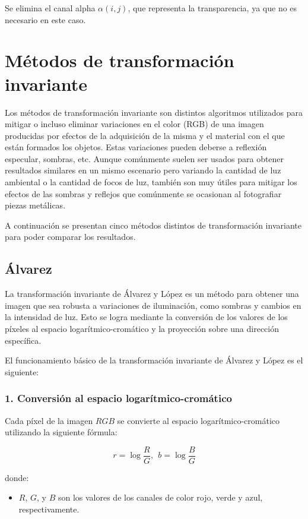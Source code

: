 Se elimina el canal alpha $\alpha(i, j)$, que representa la transparencia, ya que no es necesario en este caso.

\section{Métodos de transformación invariante}\label{metodos-de-transformación-invariante}

Los métodos de transformación invariante son distintos algoritmos utilizados para mitigar o incluso eliminar variaciones en el color (RGB) de una imagen producidas por efectos de la adquisición de la misma y el material con el que están formados los objetos. Estas variaciones pueden deberse a reflexión especular, sombras, etc. Aunque comúnmente suelen ser usados para obtener resultados similares en un mismo escenario pero variando la cantidad de luz ambiental o la cantidad de focos de luz, también son muy útiles para mitigar los efectos de las sombras y reflejos que comúnmente se ocasionan al fotografiar piezas metálicas. 

A continuación se presentan cinco métodos distintos de transformación invariante para poder comparar los resultados.

\subsection{Álvarez}\label{alvarez}
La transformación invariante de Álvarez y López \cite{alvarez2011} es un método para obtener una imagen que sea robusta a variaciones de iluminación, como sombras y cambios en la intensidad de luz. Esto se logra mediante la conversión de los valores de los píxeles al espacio logarítmico-cromático y la proyección sobre una dirección específica.

El funcionamiento básico de la transformación invariante de Álvarez y López es el siguiente:

\subsubsection{1. Conversión al espacio logarítmico-cromático}

Cada píxel de la imagen $RGB$ se convierte al espacio logarítmico-cromático utilizando la siguiente fórmula:

$$r=\log \frac{R}{G},~~b=\log \frac{B}{G}$$

donde:

\begin{itemize}
\setlength{\itemsep}{-1ex}
   \item{\begin{flushleft} $R$, $G$, y $B$ son los valores de los canales de color rojo, verde y azul, respectivamente. \end{flushleft}}
\end{itemize}

